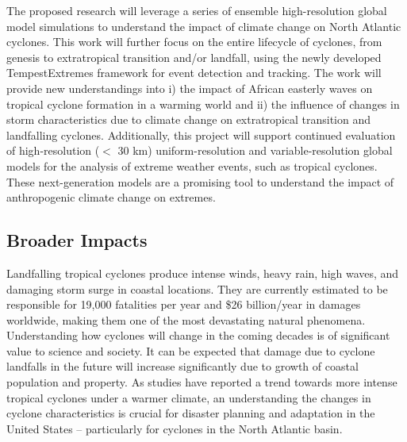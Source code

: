 \documentclass[11pt]{article}
\begin{document}
The proposed research will leverage a series of ensemble high-resolution global model simulations to understand the impact of climate change on North Atlantic cyclones. This work will further focus on the entire lifecycle of cyclones, from genesis to extratropical transition and/or landfall, using the newly developed TempestExtremes framework for event detection and tracking.  The work will provide new understandings into i) the impact of African easterly waves on tropical cyclone formation in a warming world and ii) the influence of changes in storm characteristics due to climate change on extratropical transition and landfalling cyclones. Additionally, this project will support continued evaluation of high-resolution ($<$ 30 km) uniform-resolution and variable-resolution global models for the analysis of extreme weather events, such as tropical cyclones.  These next-generation models are a promising tool to understand the impact of anthropogenic climate change on extremes.  

\vspace{-0.7cm}
\subsection*{Broader Impacts}
\vspace{-0.6cm}

Landfalling tropical cyclones produce intense winds, heavy rain, high waves, and damaging storm surge in coastal locations. They are currently estimated to be responsible for 19,000 fatalities per year and \$26 billion/year in damages worldwide, making them one of the most devastating natural phenomena.  Understanding how cyclones will change in the coming decades is of significant value to science and society. It can be expected that damage due to cyclone landfalls in the future will increase significantly due to growth of coastal population and property.  As studies have reported a trend towards more intense tropical cyclones under a warmer climate, an understanding the changes in cyclone characteristics is crucial for disaster planning and adaptation in the United States -- particularly for cyclones in the North Atlantic basin.
\end{document}
